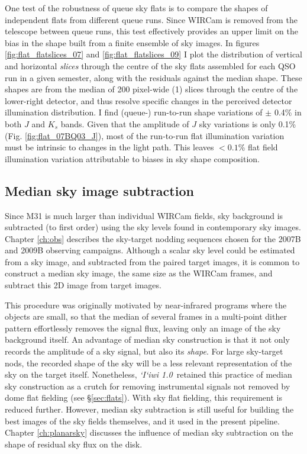 \documentclass[iop]{emulateapj}
\newcommand{\sw}[1]{\textit{#1}} %
\newcommand{\iiwione}{\sw{`I`iwi 1.0}}
\begin{document}
One test of the robustness of queue sky flats is to compare the shapes of independent flats from different queue runs. Since WIRCam is removed from the telescope between queue runs, this test effectively provides an upper limit on the bias in the shape built from a finite ensemble of sky images. In figures \ref{fig:flat_flatslices_07} and \ref{fig:flat_flatslices_09} I plot the distribution of vertical and horizontal \emph{slices} through the centre of the sky flats assembled for each QSO run in a given semester, along with the residuals against the median shape. These shapes are from the median of 200 pixel-wide (1\arcmin) slices through the centre of the lower-right detector, and thus resolve specific changes in the perceived detector illumination distribution. I find (queue-) run-to-run shape variations of $\pm$ 0.4\% in both $J$ and $K_s$ bands. Given that the amplitude of $J$ sky variations is only 0.1\% (Fig. \ref{fig:flat_07BQ03_J}), most of the run-to-run flat illumination variation must be intrinsic to changes in the light path. This leaves $<0.1$\% flat field illumination variation attributable to biases in sky shape composition.

\subsection{Median sky image subtraction} %
\label{sec:mediansky}

Since M31 is much larger than individual WIRCam fields, sky background is subtracted (to first order) using the sky levels found in contemporary sky images. Chapter \ref{ch:obs} describes the sky-target nodding sequences chosen for the 2007B and 2009B observing campaigns. Although a scalar sky level could be estimated from a sky image, and subtracted from the paired target images, it is common to construct a median sky image, the same size as the WIRCam frames, and subtract this 2D image from target images.

This procedure was originally motivated by near-infrared programs where the objects are small, so that the median of several frames in a multi-point dither pattern effortlessly removes the signal flux, leaving only an image of the sky background itself. An advantage of median sky construction is that it not only records the amplitude of a sky signal, but also its \emph{shape}. For large sky-target nods, the recorded shape of the sky will be a less relevant representation of the sky on the target itself. Nonetheless, \iiwione\ retained this practice of median sky construction as a crutch for removing instrumental signals not removed by dome flat fielding (see \S \ref{sec:flats}). With sky flat fielding, this requirement is reduced further. However, median sky subtraction is still useful for building the best images of the sky fields themselves, and it used in the present pipeline. Chapter \ref{ch:planarsky} discusses the influence of median sky subtraction on the shape of residual sky flux on the disk.
\end{document}
